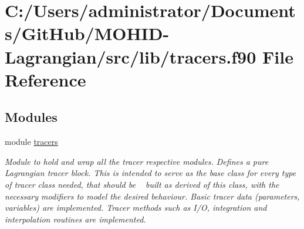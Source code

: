 \hypertarget{tracers_8f90}{}\section{C\+:/\+Users/administrator/\+Documents/\+Git\+Hub/\+M\+O\+H\+I\+D-\/\+Lagrangian/src/lib/tracers.f90 File Reference}
\label{tracers_8f90}
\subsection*{Modules}
\begin{DoxyCompactItemize}
\item 
module \mbox{\hyperlink{namespacetracers}{tracers}}
\begin{DoxyCompactList}\small\item\em Module to hold and wrap all the tracer respective modules. Defines a pure Lagrangian tracer block. This is intended to serve as the base class for every type of tracer class needed, that should be ~\newline
 built as derived of this class, with the necessary modifiers to model the desired behaviour. Basic tracer data (parameters, variables) are implemented. Tracer methods such as I/O, integration and interpolation routines are implemented. \end{DoxyCompactList}\end{DoxyCompactItemize}
